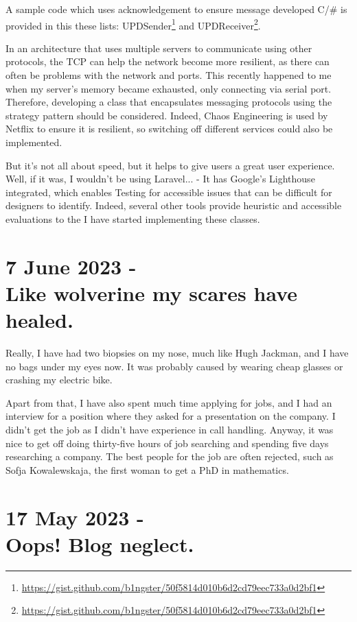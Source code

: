 \documentclass{article}
\newcommand\footurl[1]{\footnote{\url{#1}}}
\newcommand\urllink[2]{#1\footurl{#2}}
\begin{document}
 A sample code which uses acknowledgement to ensure message developed C/# is provided in this these lists: \urllink{UPDSender}{https://gist.github.com/b1ngster/50f5814d010b6d2cd79eec733a0d2bf1} and \urllink{UPDReceiver}{https://gist.github.com/b1ngster/50f5814d010b6d2cd79eec733a0d2bf1}. 

In an architecture that uses multiple servers to communicate using other protocols, the TCP can help the network become more resilient, as there can often be problems with the network and ports. This recently happened to me when my server's memory became exhausted, only connecting via serial port. Therefore, developing a class that encapsulates messaging protocols using the strategy pattern should be considered. Indeed, Chaos Engineering is used by Netflix to ensure it is resilient, so switching off different services could also be implemented. 

But it's not all about speed, but it helps to give users a great user experience. Well, if it was, I wouldn't be using Laravel... - It has Google's Lighthouse integrated, which enables Testing for accessible issues that can be difficult for designers to identify. Indeed, several other tools provide heuristic and accessible evaluations to the I have started implementing these classes.



\section*{7 June 2023 - \\ Like wolverine my scares have healed.}

Really, I have had two biopsies on my nose, much like Hugh Jackman, and I have no bags under my eyes now. It was probably caused by wearing cheap glasses or crashing my electric bike. 

Apart from that, I have also spent much time applying for jobs, and I had an interview for a position where they asked for a presentation on the company. I didn't get the job as I didn't have experience in call handling. Anyway, it was nice to get off doing thirty-five hours of job searching and spending five days researching a company. The best people for the job are often rejected, such as Sofja Kowalewskaja, the first woman to get a PhD in mathematics.

\section*{17 May 2023 - \\ Oops! Blog neglect.}
\end{document}
